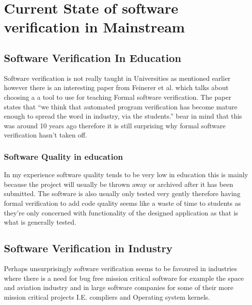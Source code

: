 \documentclass[a4paper,12pt]{scrartcl}
\begin{document}
	\section{Current State of software verification in Mainstream}
	{
		\subsection{Software Verification In Education}
		{
			Software verification is not really taught in Universities as mentioned earlier however there is an interesting paper from Feinerer et al. \cite{Feinerer2008} which talks about choosing a a tool to use for teaching Formal software verification. The paper states that \enquote{we think that automated program verification has become mature enough to spread the word in industry, via the students.}\cite{Feinerer2008} bear in mind that this was around 10 years ago therefore it is still surprising why formal software verification hasn't taken off.
			\subsubsection{Software Quality in education}
			{
				In my experience software quality tends to be very low in education this is mainly because the project will usually be thrown away or archived after it has been submitted. The software is also usually only tested very gently therefore having formal verification to add code quality seems like a waste of time to students as they're only concerned with functionality of the designed application as that is what is generally tested.
			}
		}
		\subsection{Software Verification in Industry}
		{
			Perhaps unsurprisingly software verification seems to be favoured in industries where there is a need for bug free mission critical software for example the space and aviation industry\cite{Feldt2010, Nelson2003} and in large software companies for some of their more mission critical projects\cite{Hunt2005} I.E. compliers and Operating system kernels. 
		}
	}
\end{document}
